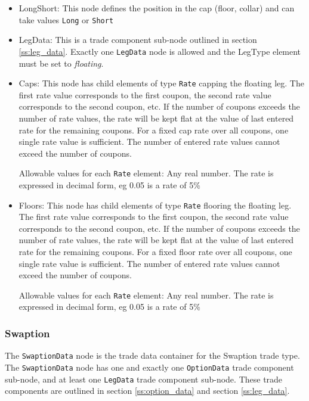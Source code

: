 \begin{itemize}

\item LongShort: This node defines the position in the cap (floor, collar) and can take values \lstinline!Long! or
  \lstinline!Short!

\item LegData: This is a trade component sub-node outlined in section \ref{ss:leg_data}. Exactly
  one \lstinline!LegData! node is allowed and the LegType element must be set to \emph{floating}.

\item Caps: This node has child elements of type \lstinline!Rate!
  capping the floating leg. The first rate value corresponds to the
  first coupon, the second rate value corresponds to the second
  coupon, etc. If the number of coupons exceeds the number of rate
  values, the rate will be kept flat at the value of last entered rate
  for the remaining coupons. For a fixed cap rate over all coupons,
  one single rate value is sufficient. The number of entered rate
  values cannot exceed the number of coupons. 

  Allowable values for each \lstinline!Rate! element: Any real number. The rate is expressed in decimal form, eg 0.05 is
  a rate of 5\%

\item Floors: This node has child elements of type
  \lstinline!Rate! flooring the floating leg.  The first rate value
  corresponds to the first coupon, the second rate value corresponds
  to the second coupon, etc. If the number of coupons exceeds the
  number of rate values, the rate will be kept flat at the value of
  last entered rate for the remaining coupons. For a fixed floor rate
  over all coupons, one single rate value is sufficient. The number of
  entered rate values cannot exceed the number of coupons.

  Allowable values for each \lstinline!Rate! element: Any real number. The rate is expressed in decimal form, eg 0.05 is
  a rate of 5\%

\end{itemize}

\subsubsection{Swaption}

The \lstinline!SwaptionData!  node is the trade data container for the Swaption trade type. The \lstinline!SwaptionData!
node has one and exactly one \lstinline!OptionData! trade component sub-node, and at least one \lstinline!LegData! trade
component sub-node.  These trade components are outlined in section \ref{ss:option_data} and section
\ref{ss:leg_data}.\\

